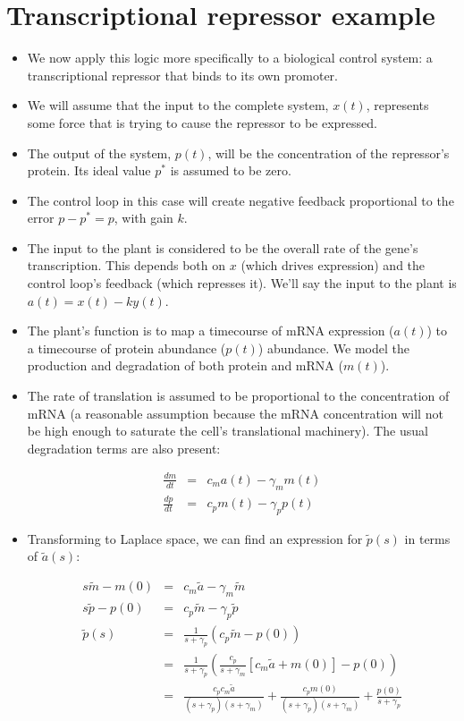 \documentclass{article}
\begin{document}
\section*{Transcriptional repressor example}

\begin{itemize}
\item We now apply this logic more specifically to a biological control system: a transcriptional repressor that binds to its own promoter.
\item We will assume that the input to the complete system, $x(t)$, represents some force that is trying to cause the repressor to be expressed.
\item The output of the system, $p(t)$, will be the concentration of the repressor's protein. Its ideal value $p^*$ is assumed to be zero.
\item The control loop in this case will create negative feedback proportional to the error $p - p^* = p$, with gain $k$.
\item The input to the plant is considered to be the overall rate of the gene's transcription. This depends both on $x$ (which drives expression) and the control loop's feedback (which represses it). We'll say the input to the plant is $a(t) = x(t) - ky(t)$.
\item The plant's function is to map a timecourse of mRNA expression ($a(t)$) to a timecourse of protein abundance ($p(t)$) abundance. We model the production and degradation of both protein and mRNA ($m(t)$).
\item The rate of translation is assumed to be proportional to the concentration of mRNA (a reasonable assumption because the mRNA concentration will not be high enough to saturate the cell's translational machinery). The usual degradation terms are also present:

\begin{eqnarray*}
\frac{dm}{dt} & = & c_m a(t) - \gamma_m m(t)\\
\frac{dp}{dt} & = & c_p m(t) - \gamma_p p(t)
\end{eqnarray*}

\item Transforming to Laplace space, we can find an expression for $\tilde{p}(s)$ in terms of $\tilde{a}(s)$:

\begin{eqnarray*}
s\tilde{m} - m(0) & = & c_m \tilde{a} - \gamma_m \tilde{m}\\
s\tilde{p} - p(0) & = & c_p \tilde{m} - \gamma_p \tilde{p}\\
\tilde{p}(s)  & = & \frac{1}{s + \gamma_p} \left( c_p \tilde{m} - p(0) \right)\\
& = &  \frac{1}{s + \gamma_p} \left( \frac{c_p}{s + \gamma_m} \left[ c_m \tilde{a} + m(0) \right] - p(0) \right)\\
& = & \frac{c_p c_m \tilde{a}}{\left( s + \gamma_p \right)\left( s + \gamma_m \right)} + \frac{c_p m(0)}{\left( s + \gamma_p \right)\left( s + \gamma_m \right)} + \frac{p(0)}{s + \gamma_p}
\end{eqnarray*}


\end{itemize}
\end{document}
